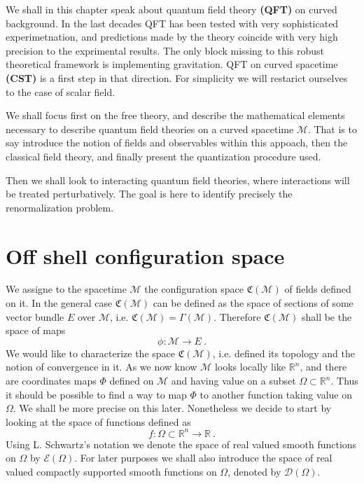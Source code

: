 \documentclass[10pt]{book}
\newcommand{\Dcal}{\mathcal{D}}
\newcommand{\Ecal}{\mathcal{E}}
\newcommand{\Mcal}{\mathcal{M}}
\newcommand{\Rbb}{\mathbb{R}}
\newcommand{\Crak}{\mathfrak{C}}
\theoremstyle{break}
\begin{document}
We shall in this chapter speak about quantum field theory \textbf{(QFT)} on curved background. In the last decades QFT has been tested with very sophisticated experimetnation, and predictions made by the theory coincide with very high precision to the exprimental results. The only block missing to this robust theoretical framework is implementing gravitation. QFT on curved spacetime \textbf{(CST)} is a first step in that direction. For simplicity we will restarict ourselves to the case of scalar field.\par%


\bigskip


We shall focus first on the free theory, and describe the mathematical elements necessary to describe quantum field theories on a curved spacetime $\Mcal$. That is to say introduce the notion of fields and observables within this appoach, then the classical field theory, and finally present the quantization procedure used.\par%


\bigskip


Then we shall look to interacting quantum field theories, where interactions will be treated perturbatively. The goal is here to identify precisely the renormalization problem.


\section{Off shell configuration space}


We assigne to the spacetime $\Mcal$ the configuration space $\Crak(\Mcal)$ of fields defined on it. In the general case $\Crak(\Mcal)$ can be defined as the space of sections of some vector bundle $E$ over $\Mcal$, i.e. $\Crak(\Mcal) = \Gamma(\Mcal)$. Therefore $\Crak(\Mcal)$ shall be the space of maps 
%
\begin{equation*}
\phi : \Mcal \to E \ . 
\end{equation*}
%
We would like to characterize the space $\Crak(\Mcal)$, i.e. defined its topology and the notion of convergence in it. As we now know $\Mcal$ looks locally like $\Rbb^n$, and there are coordinates maps $\Phi$ defined on $\Mcal$ and having value on a subset $\Omega \subset \Rbb^n$. Thus it should be possible to find a way to map $\Phi$ to another function taking value on $\Omega$. We shall be more precise on this later. Nonetheless we decide to start by looking at the space of functions defined as 
%
\begin{equation*}
f : \Omega \subset \Rbb^n \to \Rbb \ . 
\end{equation*}
%
Using L. Schwartz's notation we denote the space of real valued smooth functions on $\Omega$ by $\Ecal(\Omega)$\index{$\Ecal(\Omega)$}. For later purposes we shall also introduce the space of real valued compactly supported smooth functions on $\Omega$, denoted by $\Dcal(\Omega)$\index{$\Dcal(\Omega)$}.
\end{document}
